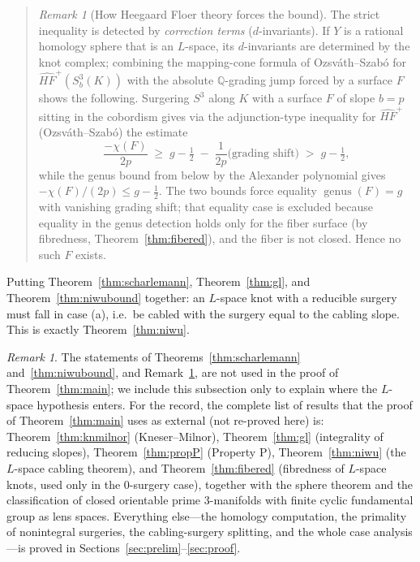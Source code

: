 \documentclass[11pt]{article}
\theoremstyle{definition}
\theoremstyle{remark}
\newtheorem{remark}[theorem]{Remark}
\newcommand{\HF}{\widehat{HF}}
\begin{document}
\begin{quote}
\begin{remark}[How Heegaard Floer theory forces the bound]\label{rem:howhf}
The strict inequality is detected by \emph{correction terms}
($d$-invariants).  If $Y$ is a rational homology sphere that is an $L$-space,
its $d$-invariants are determined by the knot complex; combining the
mapping-cone formula of Ozsv\'ath--Szab\'o for $\HF^+(S^3_b(K))$ with the
absolute $\mathbb{Q}$-grading jump forced by a surface $F$ shows the
following.  Surgering $S^3$ along $K$ with a surface $F$ of slope $b=p$
sitting in the cobordism gives via the adjunction-type inequality for
$\HF^+$ (Ozsv\'ath--Szab\'o) the estimate
\[
\frac{-\chi(F)}{2p}\;\ge\; g-\tfrac12 \;-\;\frac{1}{2p}\bigl(\text{grading
shift}\bigr)\;>\;g-\tfrac12,
\]
while the genus bound from below by the Alexander polynomial gives
$-\chi(F)/(2p)\le g-\tfrac12$.  The two bounds force equality
$\operatorname{genus}(F)=g$ with vanishing grading shift; that equality case
is excluded because equality in the genus detection holds only for the fiber
surface (by fibredness, Theorem~\ref{thm:fibered}), and the fiber is not
closed.  Hence no such $F$ exists.
\end{remark}
\end{quote}

\noindent Putting Theorem~\ref{thm:scharlemann}, Theorem~\ref{thm:gl}, and
Theorem~\ref{thm:niwubound} together: an $L$-space knot with a reducible
surgery must fall in case (a), i.e.\ be cabled with the surgery equal to the
cabling slope.  This is exactly Theorem~\ref{thm:niwu}.

\begin{remark}
The statements of Theorems~\ref{thm:scharlemann} and~\ref{thm:niwubound}, and
Remark~\ref{rem:howhf}, are not used in the proof of
Theorem~\ref{thm:main}; we include this subsection only to explain where the
$L$-space hypothesis enters.  For the record, the complete list of results
that the proof of Theorem~\ref{thm:main} uses as external (not re-proved here)
is: Theorem~\ref{thm:knmilnor} (Kneser--Milnor),
Theorem~\ref{thm:gl} (integrality of reducing slopes), Theorem~\ref{thm:propP}
(Property P), Theorem~\ref{thm:niwu} (the $L$-space cabling theorem), and
Theorem~\ref{thm:fibered} (fibredness of $L$-space knots, used only in the
$0$-surgery case), together with the sphere theorem and the classification of
closed orientable prime $3$-manifolds with finite cyclic fundamental group as
lens spaces.  Everything else---the homology computation, the primality of
nonintegral surgeries, the cabling-surgery splitting, and the whole case
analysis---is proved in Sections~\ref{sec:prelim}--\ref{sec:proof}.
\end{remark}
\end{document}
